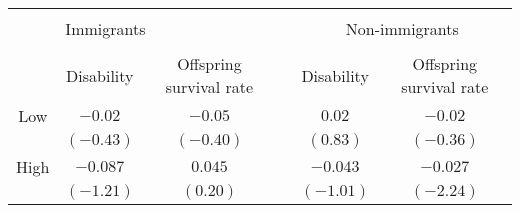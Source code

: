 \documentclass[12pt, a4paper]{article}
\begin{document}
\begin{tabular}{cccp{1ex}cc}
	\hline\\[-2.0ex]
	& \multicolumn{2}{l}{Immigrants} &  & \multicolumn{2}{c}{Non-immigrants} \\[1.0ex]
	\cline{2-3}\cline{5-6}\\[-2.0ex]
	& Disability & Offspring survival rate &  & Disability & Offspring survival rate \\[1.0ex]
	\hline
	Low & $-0.02$ & $-0.05$ && $0.02$ & $-0.02$ \\
	& $(-0.43)$ & $(-0.40)$ && $(0.83)$ & $(-0.36)$ \\[0.5ex]
	High & $-0.087$ & $0.045$ && $-0.043$ & $-0.027$ \\
	& $(-1.21)$ & $(0.20)$ && $(-1.01)$ & $(-2.24)$\\
	\hline
\end{tabular}
\end{document}
